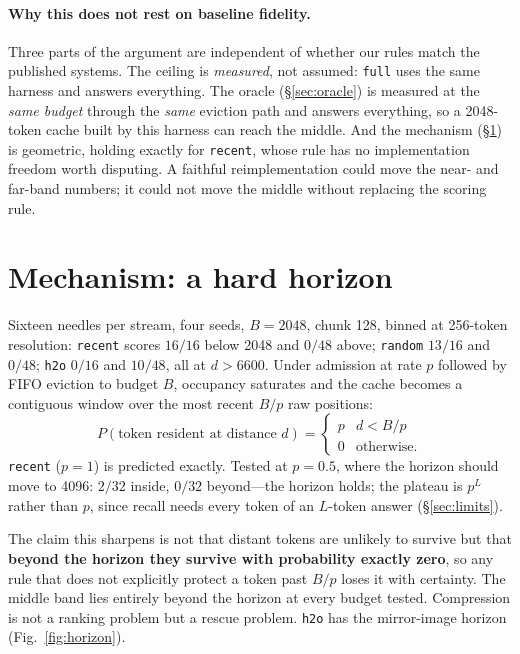 \documentclass[10pt]{article}
\begin{document}
\paragraph{Why this does not rest on baseline fidelity.} Three parts of the
argument are independent of whether our rules match the published systems. The
ceiling is \emph{measured}, not assumed: \texttt{full} uses the same harness and
answers everything. The oracle (\S\ref{sec:oracle}) is measured at the
\emph{same budget} through the \emph{same} eviction path and answers
everything, so a 2048-token cache built by this harness can reach the middle.
And the mechanism (\S\ref{sec:mech}) is geometric, holding exactly for
\texttt{recent}, whose rule has no implementation freedom worth disputing. A
faithful reimplementation could move the near- and far-band numbers; it could
not move the middle without replacing the scoring rule.

\section{Mechanism: a hard horizon}\label{sec:mech}



Sixteen needles per stream, four seeds, $B{=}2048$, chunk 128, binned at
256-token resolution: \texttt{recent} scores $16/16$ below 2048 and $0/48$
above; \texttt{random} $13/16$ and $0/48$; \texttt{h2o} $0/16$ and $10/48$, all
at $d > 6600$. Under admission at rate $p$ followed by FIFO eviction to budget
$B$, occupancy saturates and the cache becomes a contiguous window over the
most recent $B/p$ raw positions:
\begin{equation}
  P(\text{token resident at distance } d) =
  \begin{cases} p & d < B/p \\ 0 & \text{otherwise.}\end{cases}
  \label{eq:horizon}
\end{equation}
\texttt{recent} ($p{=}1$) is predicted exactly. Tested at $p{=}0.5$, where the
horizon should move to 4096: $2/32$ inside, $0/32$ beyond---the horizon holds; the plateau is
$p^L$ rather than $p$, since recall needs every token of an $L$-token answer
(\S\ref{sec:limits}).

The claim this sharpens is not that distant tokens are unlikely to survive but
that \textbf{beyond the horizon they survive with probability exactly zero}, so
any rule that does not explicitly protect a token past $B/p$ loses it with
certainty. The middle band lies entirely beyond the horizon at every budget
tested. Compression is not a ranking problem but a rescue problem.
\texttt{h2o} has the mirror-image horizon (Fig.~\ref{fig:horizon}).
\end{document}
